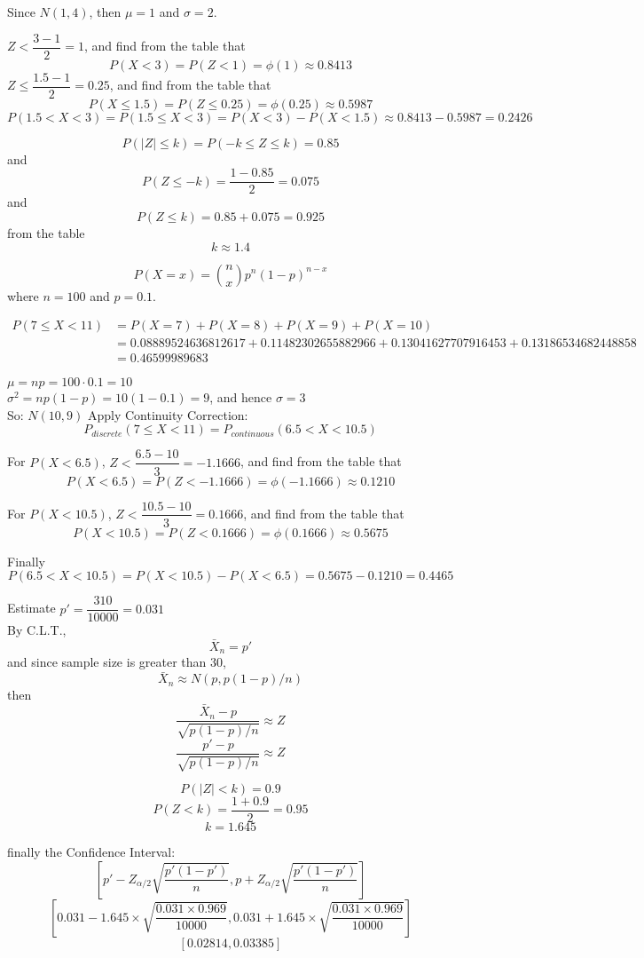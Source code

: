 \documentclass{assignment}
\begin{document}
\maketitle

\question
Since $N(1,4)$, then $\mu=1$ and $\sigma=2$.
\begin{alphaparts}
\questionpart
$Z< \dfrac{3-1}{2}=1$, and find from the table that
$$P(X<3)=P(Z<1)=\phi(1)\approx0.8413$$
\questionpart
$Z\leq \dfrac{1.5-1}{2}=0.25$, and find from the table that
$$P(X\leq1.5)=P(Z\leq0.25)=\phi(0.25)\approx0.5987$$
\questionpart
$$P(1.5<X<3)=P(1.5\leq X<3)=P(X<3)-P(X<1.5)\approx0.8413-0.5987=0.2426$$
\end{alphaparts}

\question
$$P(|Z|\leq k)=P(-k \leq Z \leq k)=0.85$$
and
$$P(Z\leq -k)=\dfrac{1-0.85}{2}=0.075$$
and
$$P(Z\leq k)=0.85+0.075=0.925$$
from the table
$$k\approx1.4$$

\question
\begin{alphaparts}
\questionpart
$$P(X=x)={n \choose x}p^n(1-p)^{n-x}$$
where $n=100$ and $p=0.1$.

$$
\begin{aligned}
P(7\leq X < 11)&=P(X=7)+P(X=8)+P(X=9)+P(X=10)\\
&=0.08889524636812617+
0.11482302655882966+
0.13041627707916453+
0.13186534682448858\\
&=0.46599989683
\end{aligned}
$$

\questionpart
$\mu=np=100\cdot 0.1=10$\\
$\sigma^2=np(1-p)=10(1-0.1)=9$, and hence $\sigma=3$\\
So: $N(10,9)$
\questionpart
Apply Continuity Correction:
$$P_{discrete}(7\leq X<11)=P_{continuous}(6.5<X<10.5)$$

For $P(X<6.5)$, $Z<\dfrac{6.5-10}{3}=-1.1666$, and find from the table that
$$P(X<6.5)=P(Z< -1.1666)=\phi(-1.1666)\approx0.1210$$

For $P(X<10.5)$, $Z<\dfrac{10.5-10}{3}=0.1666$, and find from the table that
$$P(X<10.5)=P(Z<0.1666)=\phi(0.1666)\approx0.5675$$

Finally
$$P(6.5<X<10.5)=P(X<10.5)-P(X<6.5)=0.5675-0.1210=0.4465
$$

\end{alphaparts}


\question

Estimate $p'=\dfrac{310}{10000}=0.031$\\
By C.L.T., 
$$\bar{X}_n=p'$$
and since sample size is greater than 30, 
$$\bar{X}_n\approx N(p,p(1-p)/n)$$
then
$$\dfrac{\bar{X}_n -p}{\sqrt{p(1-p)/n}}\approx Z$$
$$\dfrac{p' -p}{\sqrt{p(1-p)/n}}\approx Z$$

$$P(|Z|<k)=0.9$$
$$P(Z<k)=\dfrac{1+0.9}{2}=0.95$$
$$k=1.645$$

finally the Confidence Interval:
$$\left[p'-Z_{\alpha/2}\sqrt{\dfrac{p'(1-p')}{n}}, p+Z_{\alpha/2}\sqrt{\dfrac{p'(1-p')}{n}}\right]$$
$$\left[0.031-1.645\times \sqrt{\dfrac{0.031\times0.969}{10000}},0.031+1.645\times \sqrt{\dfrac{0.031\times0.969}{10000}}\right]$$
$$[0.02814, 0.03385]$$
\end{document}
